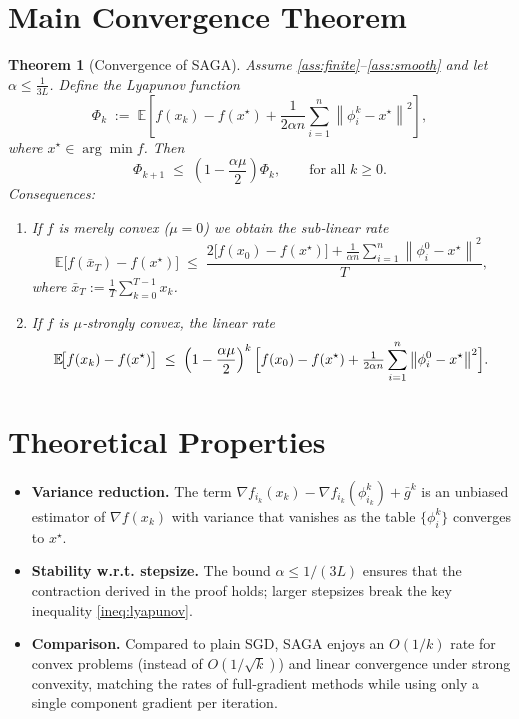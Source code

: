 \documentclass{article}
\newtheorem{theorem}{Theorem}
\newcommand{\E}{\mathbb{E}}
\newcommand{\norm}[1]{\left\|#1\right\|}
\newcommand{\grad}{\nabla}
\begin{document}
\section*{Main Convergence Theorem}
\begin{theorem}[Convergence of SAGA]\label{thm:convex}
Assume \ref{ass:finite}–\ref{ass:smooth} and let $\alpha\le\frac{1}{3L}$.
Define the Lyapunov function
\[
\Phi_k \;:=\; \E\!\left[ f(x_k)-f(x^\star)
    +\frac{1}{2\alpha n}\sum_{i=1}^{n}\norm{\phi_i^k-x^\star}^{2}\right],
\]
where $x^\star\in\arg\min f$. Then
\[
\Phi_{k+1}\;\le\;\left(1-\frac{\alpha\mu}{2}\right)\Phi_{k},
\qquad\text{for all }k\ge0.
\]
Consequences:
\begin{enumerate}
\item If $f$ is merely convex ($\mu=0$) we obtain the sub‑linear rate
\[
\E\!\bigl[f(\bar x_T)-f(x^\star)\bigr]\;\le\;\frac{2\bigl[f(x_0)-f(x^\star)\bigr]
    +\frac{1}{\alpha n}\sum_{i=1}^{n}\norm{\phi_i^0-x^\star}^{2}}{T},
\]
where $\bar x_T:=\frac1T\sum_{k=0}^{T-1}x_k$.
\item If $f$ is $\mu$‑strongly convex, the linear rate
\[
\E\!\bigl[f(x_k)-f(x^\star)\bigr]\;\le\;
\left(1-\frac{\alpha\mu}{2}\right)^{k}
\Bigl[ f(x_0)-f(x^\star)+\tfrac{1}{2\alpha n}\sum_{i=1}^{n}\norm{\phi_i^0-x^\star}^{2}\Bigr].
\]
\end{enumerate}
\end{theorem}

\section*{Theoretical Properties}
\begin{itemize}
\item \textbf{Variance reduction.} The term
$\grad f_{i_k}(x_k)-\grad f_{i_k}(\phi_{i_k}^k)+\bar g^k$ is an unbiased estimator
of $\grad f(x_k)$ with variance that vanishes as the table $\{\phi_i^k\}$
converges to $x^\star$.
\item \textbf{Stability w.r.t. stepsize.}
The bound $\alpha\le 1/(3L)$ ensures that the contraction derived in the proof
holds; larger stepsizes break the key inequality \eqref{ineq:lyapunov}.
\item \textbf{Comparison.}
Compared to plain SGD, SAGA enjoys an $O(1/k)$ rate for convex problems (instead of
$O(1/\sqrt{k})$) and linear convergence under strong convexity,
matching the rates of full‑gradient methods while using only a single component
gradient per iteration.
\end{itemize}
\end{document}
